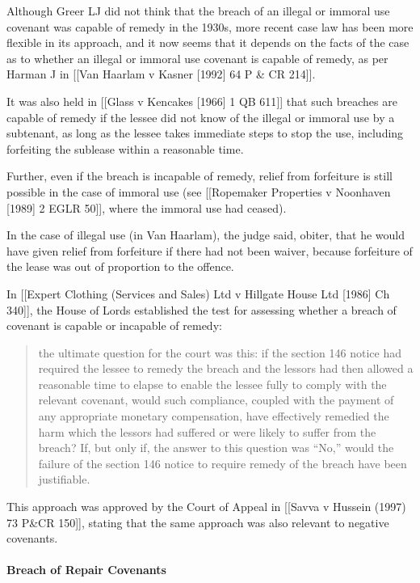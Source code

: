 \documentclass[
]{article}
\begin{document}
Although Greer LJ did not think that the breach of an illegal or immoral
use covenant was capable of remedy in the 1930s, more recent case law
has been more flexible in its approach, and it now seems that it depends
on the facts of the case as to whether an illegal or immoral use
covenant is capable of remedy, as per Harman J in {[}{[}Van Haarlam v
Kasner {[}1992{]} 64 P \& CR 214{]}{]}.

It was also held in {[}{[}Glass v Kencakes {[}1966{]} 1 QB 611{]}{]}
that such breaches are capable of remedy if the lessee did not know of
the illegal or immoral use by a subtenant, as long as the lessee takes
immediate steps to stop the use, including forfeiting the sublease
within a reasonable time.

Further, even if the breach is incapable of remedy, relief from
forfeiture is still possible in the case of immoral use (see
{[}{[}Ropemaker Properties v Noonhaven {[}1989{]} 2 EGLR 50{]}{]}, where
the immoral use had ceased).

In the case of illegal use (in Van Haarlam), the judge said, obiter,
that he would have given relief from forfeiture if there had not been
waiver, because forfeiture of the lease was out of proportion to the
offence.

In {[}{[}Expert Clothing (Services and Sales) Ltd v Hillgate House Ltd
{[}1986{]} Ch 340{]}{]}, the House of Lords established the test for
assessing whether a breach of covenant is capable or incapable of
remedy:

\begin{quote}
the ultimate question for the court was this: if the section 146 notice
had required the lessee to remedy the breach and the lessors had then
allowed a reasonable time to elapse to enable the lessee fully to comply
with the relevant covenant, would such compliance, coupled with the
payment of any appropriate monetary compensation, have effectively
remedied the harm which the lessors had suffered or were likely to
suffer from the breach? If, but only if, the answer to this question was
``No,'' would the failure of the section 146 notice to require remedy of
the breach have been justifiable.
\end{quote}

This approach was approved by the Court of Appeal in {[}{[}Savva v
Hussein (1997) 73 P\&CR 150{]}{]}, stating that the same approach was
also relevant to negative covenants.

\hypertarget{breach-of-repair-covenants}{%
\paragraph{Breach of Repair
Covenants}\label{breach-of-repair-covenants}}
\end{document}
